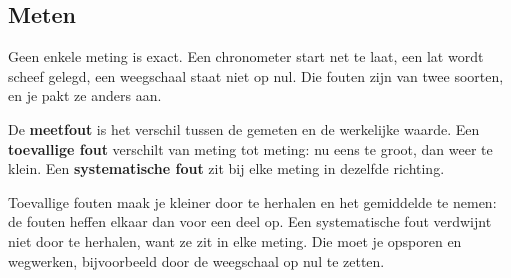 
\begin{oefeningen}
\end{oefeningen}

\subsection{Meten}

Geen enkele meting is exact. Een chronometer start net te laat, een lat wordt scheef gelegd, een weegschaal staat niet op nul. Die fouten zijn van twee soorten, en je pakt ze anders aan.

\begin{theorie}
De \textbf{\textcolor{accent}{meetfout}} is het verschil tussen de gemeten en de werkelijke waarde. Een \textbf{\textcolor{accent}{toevallige fout}} verschilt van meting tot meting: nu eens te groot, dan weer te klein. Een \textbf{\textcolor{accent}{systematische fout}} zit bij elke meting in dezelfde richting.
\end{theorie}

Toevallige fouten maak je kleiner door te herhalen en het gemiddelde te nemen: de fouten heffen elkaar dan voor een deel op. Een systematische fout verdwijnt niet door te herhalen, want ze zit in elke meting. Die moet je opsporen en wegwerken, bijvoorbeeld door de weegschaal op nul te zetten.

